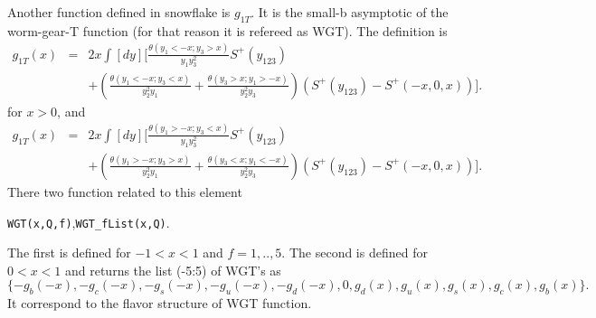 \documentclass[prd,nofootinbib,eqsecnum,final]{revtex4}
\newcommand{\nn}{\nonumber}
\renewcommand{\(}{\left(}
\renewcommand{\)}{\right)}
\renewcommand{\[}{\left[}
\renewcommand{\]}{\right]}
\begin{document}
Another function defined in snowflake is $g_{1T}$. It is the small-b asymptotic of the worm-gear-T function (for that reason it is refereed as WGT). The definition is
\begin{eqnarray}
g_{1T}(x)&=&
2x\int [dy] \Bigg[
\frac{\theta(y_1<-x;y_3>x)}{y_1y_3^2}S^+(y_{123})
\\\nn &&
+\(\frac{\theta(y_1<-x;y_3<x)}{y_2^2y_1}+\frac{\theta(y_3>x;y_1>-x)}{y_2^2y_3}\)\(S^+(y_{123})-S^+(-x,0,x)\)
\Bigg].
\end{eqnarray}
for $x>0$, and 
\begin{eqnarray}
g_{1T}(x)&=&
2x\int [dy] \Bigg[
\frac{\theta(y_1>-x;y_3<x)}{y_1y_3^2}S^+(y_{123})
\\\nn &&
+\(\frac{\theta(y_1>-x;y_3>x)}{y_2^2y_1}+\frac{\theta(y_3<x;y_1<-x)}{y_2^2y_3}\)\(S^+(y_{123})-S^+(-x,0,x)\)
\Bigg].
\end{eqnarray}
There two function related to this element
\begin{center}
\texttt{WGT(x,Q,f)},\qquad \texttt{WGT\_fList(x,Q)}.
\end{center}
The first is defined for $-1<x<1$ and $f=1,..,5$. The second is defined for $0<x<1$ and returns the list (-5:5) of WGT's as 
$$\{-g_b(-x),-g_c(-x),-g_s(-x),-g_u(-x),-g_d(-x),0,g_d(x),g_u(x),g_s(x),g_c(x),g_b(x)\}.$$
It correspond to the flavor structure of WGT function.
\end{document}
